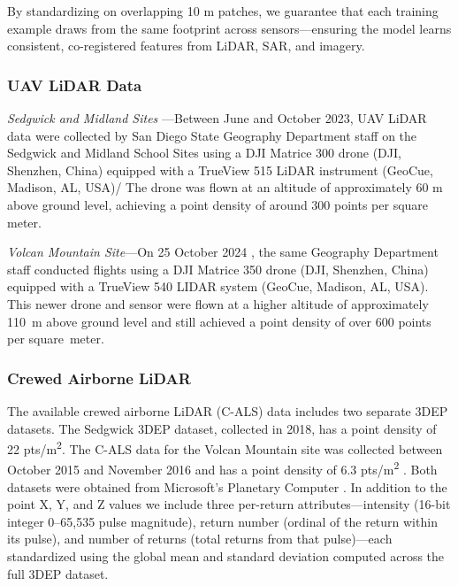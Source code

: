 \documentclass[remotesensing,article,accept,pdftex,moreauthors]{Definitions/mdpi}
\begin{document}
\vspace{-3pt}

By standardizing on overlapping 10 m patches, we guarantee that each training example draws from the same footprint across sensors—ensuring the model learns consistent, co-registered features from LiDAR, SAR, and imagery.

\subsubsection{UAV LiDAR Data}
\textit{Sedgwick and Midland Sites
}---Between June and October 2023, UAV LiDAR data were collected by San Diego State Geography Department staff on the Sedgwick and Midland School Sites using a DJI Matrice 300 drone (DJI, Shenzhen, China)
 equipped with a TrueView 515 LiDAR instrument (GeoCue, Madison, AL, USA)/
The drone was flown at an altitude of approximately 60 m above ground level, achieving a point density of around 300 points per square meter.

\textit{Volcan Mountain Site}---On 25 October 2024
, the same Geography Department staff conducted flights using a DJI Matrice 350 drone (DJI, Shenzhen, China) equipped with a TrueView 540 LIDAR system (GeoCue, Madison, AL, USA). This newer drone and sensor were flown at a higher altitude of approximately \mbox{110 m} above ground level and still achieved a point density of over 600 points per \mbox{square meter}.

\subsubsection{Crewed Airborne LiDAR}
The available crewed airborne LiDAR (C-ALS) data includes two separate 3DEP datasets. The Sedgwick 3DEP dataset, collected in 2018, has a point density of 22 pts/m\textsuperscript{2}. The C-ALS data for the Volcan Mountain site was collected between October 2015 and November 2016 and has a point density of 6.3 pts/m\textsuperscript{2} \citep{usgs_usgs_2016}. Both datasets were obtained from Microsoft's Planetary Computer \citep{us_geological_survey_3d_elevation_program_usgs_2023,planetary_computer}.
In addition to the point X, Y, and Z values we include three per-return attributes—intensity (16-bit integer 0–65,535 pulse magnitude), return number (ordinal of the return within its pulse), and number of returns (total returns from that pulse)—each standardized using the global mean and standard deviation computed across the full 3DEP dataset.
\end{document}
